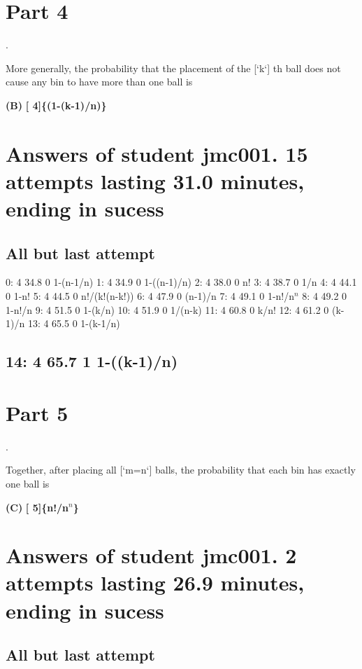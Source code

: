 \documentclass[11pt]{article}
\begin{document}
\section{Part   4}
\label{sec-7}

.

More generally, the probability that the placement of the [`k`] th
ball does not cause any bin to have more than one ball is

\textbf{(B)} \textbf{[  4]\{(1-(k-1)/n)\}}
\section{Answers of student jmc001. 15 attempts lasting 31.0 minutes, ending in sucess}
\label{sec-8}
\subsection{All but last attempt}
\label{sec-8-1}

  0:      4     34.8    0       1-(n-1/n)
  1:      4     34.9    0       1-((n-1)/n)
  2:      4     38.0    0       n!
  3:      4     38.7    0       1/n
  4:      4     44.1    0       1-n!
  5:      4     44.5    0       n!/(k!(n-k!))
  6:      4     47.9    0       (n-1)/n
  7:      4     49.1    0       1-n!/n$^n$
  8:      4     49.2    0       1-n!/n
  9:      4     51.5    0       1-(k/n)
 10:      4     51.9    0       1/(n-k)
 11:      4     60.8    0       k/n!
 12:      4     61.2    0       (k-1)/n
 13:      4     65.5    0       1-(k-1/n)
\subsection{14:   4     65.7    1       1-((k-1)/n)}
\label{sec-8-2}
\section{Part   5}
\label{sec-9}

.

Together, after placing all [`m=n`] balls, the probability that each
bin has exactly one ball is

\textbf{(C)} \textbf{[  5]\{n!/n$^n$\}}
\section{Answers of student jmc001.  2 attempts lasting 26.9 minutes, ending in sucess}
\label{sec-10}
\subsection{All but last attempt}
\label{sec-10-1}
\end{document}
